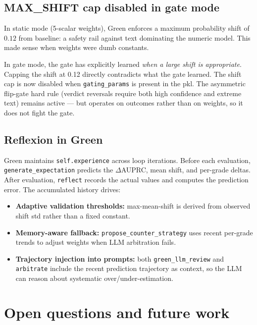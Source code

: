 \documentclass[11pt,a4paper]{article}
\begin{document}
\subsection{MAX\_SHIFT cap disabled in gate mode}

In static mode (5-scalar weights), Green enforces a maximum probability
shift of $0.12$ from baseline: a safety rail against text dominating
the numeric model. This made sense when weights were dumb constants.

In gate mode, the gate has explicitly learned \emph{when a large shift
is appropriate}. Capping the shift at 0.12 directly contradicts what
the gate learned. The shift cap is now disabled when
\texttt{gating\_params} is present in the pkl. The asymmetric
flip-gate hard rule (verdict reversals require both high confidence
and extreme text) remains active --- but operates on outcomes rather
than on weights, so it does not fight the gate.

\subsection{Reflexion in Green}

Green maintains \texttt{self.experience} across loop iterations. Before
each evaluation, \texttt{generate\_expectation} predicts the
$\Delta$AUPRC, mean shift, and per-grade deltas. After evaluation,
\texttt{reflect} records the actual values and computes the prediction
error. The accumulated history drives:

\begin{itemize}[itemsep=0pt]
    \item \textbf{Adaptive validation thresholds:} max-mean-shift is derived
          from observed shift std rather than a fixed constant.
    \item \textbf{Memory-aware fallback:} \texttt{propose\_counter\_strategy}
          uses recent per-grade trends to adjust weights when LLM arbitration
          fails.
    \item \textbf{Trajectory injection into prompts:} both
          \texttt{green\_llm\_review} and \texttt{arbitrate} include the
          recent prediction trajectory as context, so the LLM can reason
          about systematic over/under-estimation.
\end{itemize}

\section{Open questions and future work}
\label{sec:future}
\end{document}
